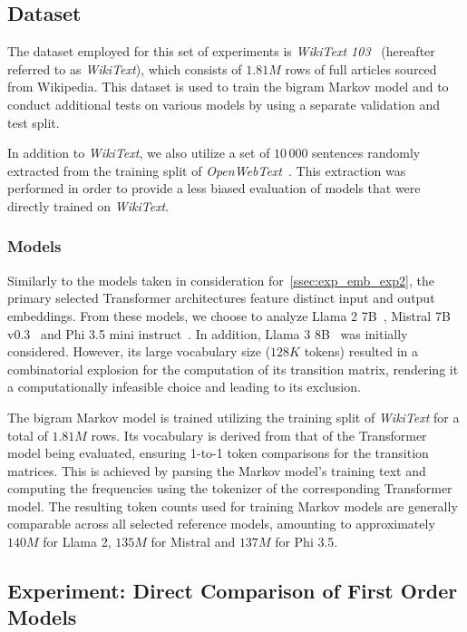 \subsection{Dataset}\label{ssec:exp_fom_dataset}

The dataset employed for this set of experiments is \emph{WikiText 103}~\cite{merity2017} (hereafter referred to as \emph{WikiText}), which consists of $1.81M$ rows of full articles sourced from Wikipedia.
This dataset is used to train the bigram Markov model and to conduct additional tests on various models by using a separate validation and test split.

In addition to \emph{WikiText}, we also utilize a set of $10\,000$ sentences randomly extracted from the training split of \emph{OpenWebText}~\cite{gokaslan2019}.
This extraction was performed in order to provide a less biased evaluation of models that were directly trained on \emph{WikiText}.

\subsubsection{Models}

Similarly to the models taken in consideration for~\cref{ssec:exp_emb_exp2}, the primary selected Transformer architectures feature distinct input and output embeddings.
From these models, we choose to analyze Llama 2 7B~\cite{touvron2023}, Mistral 7B v0.3~\cite{jiang2023} and Phi 3.5 mini instruct~\cite{abdin2024}.
In addition, Llama 3 8B~\cite{dubey2024} was initially considered.
However, its large vocabulary size ($128K$ tokens) resulted in a combinatorial explosion for the computation of its transition matrix, rendering it a computationally infeasible choice and leading to its exclusion.

The bigram Markov model is trained utilizing the training split of \emph{WikiText} for a total of $1.81M$ rows.
Its vocabulary is derived from that of the Transformer model being evaluated, ensuring 1-to-1 token comparisons for the transition matrices.
This is achieved by parsing the Markov model's training text and computing the frequencies using the tokenizer of the corresponding Transformer model.
The resulting token counts used for training Markov models are generally comparable across all selected reference models, amounting to approximately $140M$ for Llama 2, $135M$ for Mistral and $137M$ for Phi 3.5.

\subsection[Experiment: Direct Comparison of First Order Models]{Experiment: Direct Comparison of First \mbox{Order} Models}\label{ssec:exp_fom_exp1}

